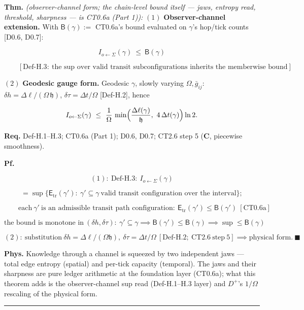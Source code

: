 \begin{theorem}\label{tag:FT-1}
\textbf{Thm.} \textit{(observer-channel form; the chain-level bound itself — jaws, entropy read, threshold, sharpness — is CT0.6a (Part 1)):} $(1)$ \textbf{Observer-channel extension.} With $\mathsf B(\gamma):=$ CT0.6a's bound evaluated on $\gamma$'s hop/tick counts [D0.6, D0.7]:

\[
I_{o\leftarrow\Sigma}(\gamma)\ \le\ \mathsf B(\gamma)
\]

\[
\qquad [\mathrm{Def\text{-}H.3}:\ \text{the sup over valid transit subconfigurations inherits the memberwise bound}]
\]

$(2)$ \textbf{Geodesic gauge form.} Geodesic $\gamma$, slowly varying $\Omega,\bar g_{ij}$: $ \delta h=\Delta\ell/(\Omega\,\mathfrak h)$, $ \delta\tau=\Delta t/\Omega$ [Def-H.2], hence

\[
I_{o\leftarrow\Sigma}(\gamma)\ \le\ \frac{1}{\Omega}\,\min\Bigl(\frac{\Delta\ell(\gamma)}{\mathfrak h},\ 4\,\Delta t(\gamma)\Bigr)\ln2 .
\]

\textbf{Req.} Def-H.1–H.3; CT0.6a (Part 1); D0.6, D0.7; CT2.6 step 5 (\textbf{C}, piecewise smoothness).

\textbf{Pf.}

\[
(1):\ \mathrm{Def\text{-}H.3}:\ I_{o\leftarrow\Sigma}(\gamma)
\]

\[
= \sup\bigl\{\mathsf E_{\mathrm{tr}}(\gamma'):\ \gamma'\subseteq\gamma\ \text{valid transit configuration over the interval}\bigr\};
\]

\[
\qquad \text{each}\ \gamma'\ \text{is an admissible transit path configuration}:\ \mathsf E_{\mathrm{tr}}(\gamma')\le\mathsf B(\gamma')\ [\mathrm{CT0.6a}]
\]

\[
\text{the bound is monotone in}\ (\delta h,\delta\tau):\ \gamma'\subseteq\gamma\implies\mathsf B(\gamma')\le\mathsf B(\gamma)\implies\sup\le\mathsf B(\gamma)
\]

\[
(2):\ \text{substitution}\ \delta h=\Delta\ell/(\Omega\mathfrak h),\ \delta\tau=\Delta t/\Omega\ [\mathrm{Def\text{-}H.2};\ \mathrm{CT2.6}\ \text{step}\ 5]\implies\text{physical form}.\ \blacksquare
\]

\textbf{Phys.} Knowledge through a channel is squeezed by two independent jaws — total edge entropy (spatial) and per-tick capacity (temporal). The jaws and their sharpness are pure ledger arithmetic at the foundation layer (CT0.6a); what this theorem adds is the observer-channel sup read (Def-H.1–H.3 layer) and $D^+$'s $1/\Omega$ rescaling of the physical form.

\vspace{2pt}\noindent\rule{\textwidth}{0.4pt}\vspace{2pt}

\end{theorem}

